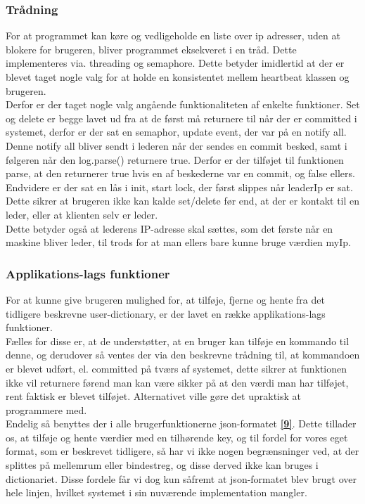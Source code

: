 \documentclass[a4paper,12pt]{article}
\begin{document}
\subsubsection{Trådning}
For at programmet kan køre og vedligeholde en liste over ip adresser, uden at blokere for brugeren, bliver programmet eksekveret i en tråd. Dette implementeres via. threading og semaphore. Dette betyder imidlertid at der er blevet taget nogle valg for at holde en konsistentet mellem heartbeat klassen og brugeren.
\\ 
Derfor er der taget nogle valg angående funktionaliteten af enkelte funktioner.
Set og delete er begge lavet ud fra at de først må returnere til når der er committed i systemet, derfor er der sat en semaphor, update event, der var på en notify all. Denne notify all bliver sendt i lederen når der sendes en commit besked, samt i følgeren når den log.parse() returnere true. Derfor er der tilføjet til funktionen parse, at den returnerer true hvis en af beskederne var en commit, og false ellers.
\\
Endvidere er der sat en lås i init, start lock, der først slippes når leaderIp er sat. Dette sikrer at brugeren ikke kan kalde set/delete før end, at der er kontakt til en leder, eller at klienten selv er leder.
\\
Dette betyder også at lederens IP-adresse skal sættes, som det første når en maskine bliver leder, til trods for at man ellers bare kunne bruge værdien myIp. 

\subsubsection{Applikations-lags funktioner}
For at kunne give brugeren mulighed for, at tilføje, fjerne og hente fra det tidligere beskrevne user-dictionary, er der lavet en række applikations-lags funktioner. \\
Fælles for disse er, at de understøtter, at en bruger kan tilføje en kommando til denne, og derudover så ventes der via den beskrevne trådning til, at kommandoen er blevet udført, el. committed på tværs af systemet, dette sikrer at funktionen ikke vil returnere førend man kan være sikker på at den værdi man har tilføjet, rent faktisk er blevet tilføjet. Alternativet ville gøre det upraktisk at programmere med.
\\[5px]
Endelig så benyttes der i alle brugerfunktionerne json-formatet \hyperref[ni]{\textbf{[9]}}. Dette tillader os, at tilføje og hente værdier med en tilhørende key, og til fordel for vores eget format, som er beskrevet tidligere, så har vi ikke nogen begrænsninger ved, at der splittes på mellemrum eller bindestreg, og disse derved ikke kan bruges i dictionariet. Disse fordele får vi dog kun såfremt at json-formatet blev brugt over hele linjen, hvilket systemet i sin nuværende implementation mangler.
\newpage
\end{document}
